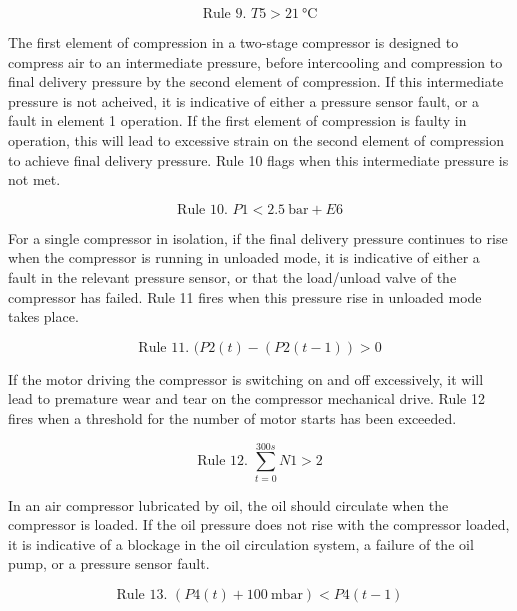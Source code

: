 \begin{equation}
\text{Rule 9. } T5 > \SI{21}{\degreeCelsius}
\label{eq:rule9}
\end{equation}

The first element of compression in a two-stage compressor is designed to compress air to an intermediate pressure, before intercooling and compression to final delivery pressure by the second element of compression. If this intermediate pressure is not acheived, it is indicative of either a pressure sensor fault, or a fault in element 1 operation. If the first element of compression is faulty in operation, this will lead to excessive strain on the second element of compression to achieve final delivery pressure. Rule 10 flags when this intermediate pressure is not met.

\begin{equation}
\text{Rule 10. } P1 < \SI{2.5}{\bar} + E6
\label{eq:rule10}
\end{equation}

For a single compressor in isolation, if the final delivery pressure continues to rise when the compressor is running in unloaded mode, it is indicative of either a fault in the relevant pressure sensor, or that the load/unload valve of the compressor has failed. Rule 11 fires when this pressure rise in unloaded mode takes place.

\begin{equation}
\text{Rule 11. } (P2(t) - (P2(t-1)) > 0
\label{eq:rule11}
\end{equation}

If the motor driving the compressor is switching on and off excessively, it will lead to premature wear and tear on the compressor mechanical drive. Rule 12 fires when a threshold for the number of motor starts has been exceeded.

\begin{equation}
\text{Rule 12. } \sum_{t = 0}^{300s}N1 > 2
\label{eq:rule12}
\end{equation}

In an air compressor lubricated by oil, the oil should circulate when the compressor is loaded. If the oil pressure does not rise with the compressor loaded, it is indicative of a blockage in the oil circulation system, a failure of the oil pump, or a pressure sensor fault.

\begin{equation}
\text{Rule 13. }(P4(t) + \SI{100}{\milli \bar}) < P4(t-1)
\label{eq:rule13}
\end{equation}

